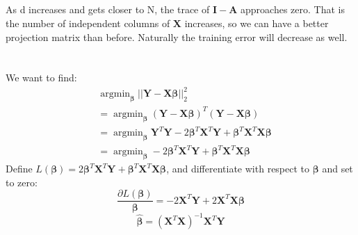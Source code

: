 \documentclass[11pt]{scrartcl} %
\DeclareMathOperator*{\argmin}{argmin}
\begin{document}
		\subsection{}
		As d increases and gets closer to N, the trace of $\boldsymbol{I - A}$ approaches zero. That is 
		the number of independent columns of $\boldsymbol{X}$ increases, so we can have a better projection matrix than before.
		Naturally the training error will decrease as well.

			
\section{} %
	\subsection{} %
		We want to find:
		\begin{equation}
			\begin{aligned}
				&\argmin_{\boldsymbol{\beta}} ||\boldsymbol{Y}-\boldsymbol{X\beta}||_2^2 \\
				&=\argmin_{\boldsymbol{\beta}} (\boldsymbol{Y}-\boldsymbol{X\beta})^T (\boldsymbol{Y}-\boldsymbol{X\beta})\\
				&=\argmin_{\boldsymbol{\beta}} \boldsymbol{Y}^T\boldsymbol{Y} - 2\boldsymbol{\beta}^T\boldsymbol{X}^T\boldsymbol{Y} +
				\boldsymbol{\beta}^T\boldsymbol{X}^T\boldsymbol{X\beta}\\
				&=\argmin_{\boldsymbol{\beta}}  - 2\boldsymbol{\beta}^T\boldsymbol{X}^T\boldsymbol{Y} +
				\boldsymbol{\beta}^T\boldsymbol{X}^T\boldsymbol{X\beta}
			\end{aligned}
		\end{equation}
		Define $L(\boldsymbol{\beta})=2\boldsymbol{\beta}^T\boldsymbol{X}^T\boldsymbol{Y} +
		\boldsymbol{\beta}^T\boldsymbol{X}^T\boldsymbol{X\beta}$, and differentiate with respect to $\boldsymbol{\beta}$
		and set to zero:
		\begin{equation}
			\frac{\partial{L(\boldsymbol{\beta})}}{\boldsymbol{\beta}}=
			-2\boldsymbol{X}^T\boldsymbol{Y} + 2\boldsymbol{X}^T\boldsymbol{X}\boldsymbol{\beta}
		\end{equation}
		\begin{equation}
			\boldsymbol{\hat{\beta}} = (\boldsymbol{X}^T\boldsymbol{X})^{-1}\boldsymbol{X}^T\boldsymbol{Y}
		\end{equation}
\end{document}
